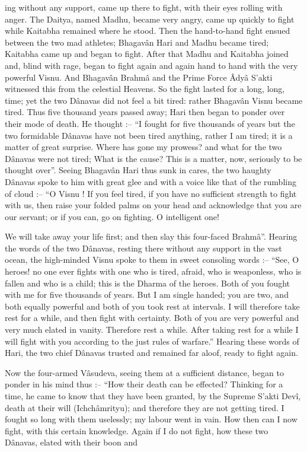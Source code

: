 ing without any support, came up there to fight, with their eyes rolling with anger. The Daitya, named Madhu, became very angry, came up quickly to fight while Kaitabha remained where he stood. Then the hand-to-hand fight ensued between the  two mad athletes; Bhagavân Hari and Madhu became tired; Kaitabha came up and began to fight. After that Madhu and Kaitabha joined and, blind with rage, began to fight again and again hand to hand with the very powerful Visnu. And Bhagavân Brahmâ and the Prime Force Âdyâ S’akti witnessed this from the celestial Heavens. So the fight lasted for a long, long, time; yet the two Dânavas did not feel a bit tired: rather Bhagavân Visnu became tired. Thus five thousand years passed away; Hari then began to ponder over their mode of death. He thought :-- “I fought for five thousands of years but the two formidable Dânavas have not been tired anything, rather I am tired; it is a matter of great surprise. Where has gone my prowess? and what for the two Dânavas were not tired; What is the cause? This is a matter, now, seriously to be thought over”. Seeing Bhagavân Hari thus sunk in cares, the two haughty Dânavas spoke to him with great glee and with a voice like that of the rumbling of cloud :-- “O Visnu ! If you feel tired, if you have no sufficient strength to fight with us, then raise your folded palms on your head and acknowledge that you are our servant; or if you can, go on fighting. O intelligent one!

We will take away your life first; and then slay this four-faced Brahmâ”. Hearing the words of the two Dânavas, resting there without any support in the vast ocean, the high-minded Visnu spoke to them in sweet consoling words :-- “See, O heroes! no one ever fights with one who is tired, afraid, who is weaponless, who is fallen and who is a child; this is the Dharma of the heroes. Both of you fought with me for five thousands of years. But I am single handed; you are two, and both equally powerful and both of you took rest at intervals. I will therefore take rest for a while, and then fight with certainty. Both of you are very powerful and very much elated in vanity. Therefore rest a while. After taking rest for a while I will fight with you according to the just rules of warfare.” Hearing these words of Hari, the two chief Dânavas trusted and remained far aloof, ready to fight again.

 

Now the four-armed Vâsudeva, seeing them at a sufficient distance, began to ponder in his mind thus :-- “How their death can be effected? Thinking for a time, he came to know that they have been granted, by the Supreme S’akti Devî, death at their will (Ichchâmrityu); and therefore they are not getting tired. I fought so long with them uselessly; my labour went in vain. How then can I now fight, with this certain knowledge. Again if I do not fight, how these two Dânavas, elated with their boon and


